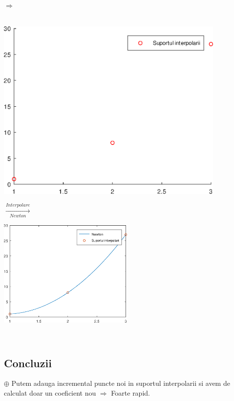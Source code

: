 \documentclass{article}
\begin{document}
$\Longrightarrow$ \\\\

\hspace{0.65cm}\begin{minipage}{0.4\textwidth}
    \includegraphics[width=0.85\textwidth]{scatter_ex}
\end{minipage}\hspace{-0.5cm}
{\LARGE$\xrightarrow[Newton]{Interpolare}$}\;\;
\begin{minipage}{0.7\textwidth}
    \includegraphics[width=0.5\textwidth]{newton_ex}
\end{minipage}\\


\subsection{Concluzii}
\tab
$\oplus$ Putem adauga incremental puncte noi in suportul interpolarii si avem de calculat doar un coeficient nou $\Rightarrow$ Foarte rapid.\\
\end{document}
